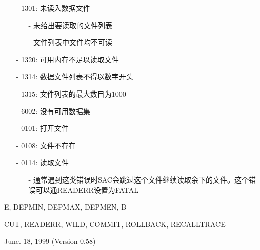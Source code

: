 \begin{itemize}
\item[-]1301: 未读入数据文件
	\begin{itemize}
	\item[-]未给出要读取的文件列表
	\item[-]文件列表中文件均不可读
	\end{itemize}
\item[-]1320: 可用内存不足以读取文件
\item[-]1314: 数据文件列表不得以数字开头
\item[-]1315: 文件列表的最大数目为1000
\item[-]6002: 没有可用数据集
\end{itemize}

\begin{itemize}
\item[-]0101: 打开文件
\item[-]0108: 文件不存在
\item[-]0114: 读取文件
	\begin{itemize}
	\item[-]通常遇到这类错误时SAC会跳过这个文件继续读取余下的文件。这个错误可以通READERR设置为FATAL
	\end{itemize}
\end{itemize}

E, DEPMIN, DEPMAX, DEPMEN, B 

CUT, READERR, WILD, COMMIT, ROLLBACK, RECALLTRACE

June. 18, 1999 (Version 0.58)
